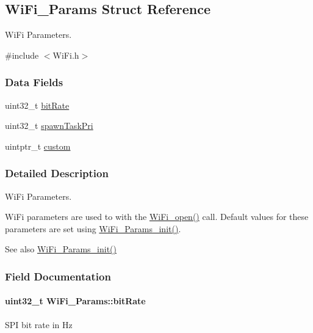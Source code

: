 \subsection{Wi\+Fi\+\_\+\+Params Struct Reference}
\label{struct_wi_fi___params}


Wi\+Fi Parameters.  




{\ttfamily \#include $<$Wi\+Fi.\+h$>$}

\subsubsection*{Data Fields}
\begin{DoxyCompactItemize}
\item 
uint32\+\_\+t \hyperlink{struct_wi_fi___params_a77d958843391bba7c381db641a8de69b}{bit\+Rate}
\item 
uint32\+\_\+t \hyperlink{struct_wi_fi___params_a94ad7c8da2b1cdca8c541d727acc3be1}{spawn\+Task\+Pri}
\item 
uintptr\+\_\+t \hyperlink{struct_wi_fi___params_a1dd49efc509d400025dc223945611737}{custom}
\end{DoxyCompactItemize}


\subsubsection{Detailed Description}
Wi\+Fi Parameters. 

Wi\+Fi parameters are used to with the \hyperlink{_wi_fi_8h_a74bfb46543ca040aabea15dc58f16e92}{Wi\+Fi\+\_\+open()} call. Default values for these parameters are set using \hyperlink{_wi_fi_8h_a89959d0d9640421ee0b8c68eca240ae0}{Wi\+Fi\+\_\+\+Params\+\_\+init()}.

\begin{DoxySeeAlso}{See also}
\hyperlink{_wi_fi_8h_a89959d0d9640421ee0b8c68eca240ae0}{Wi\+Fi\+\_\+\+Params\+\_\+init()} 
\end{DoxySeeAlso}


\subsubsection{Field Documentation}
\paragraph[{bit\+Rate}]{\setlength{\rightskip}{0pt plus 5cm}uint32\+\_\+t Wi\+Fi\+\_\+\+Params\+::bit\+Rate}\label{struct_wi_fi___params_a77d958843391bba7c381db641a8de69b}
S\+P\+I bit rate in Hz 
